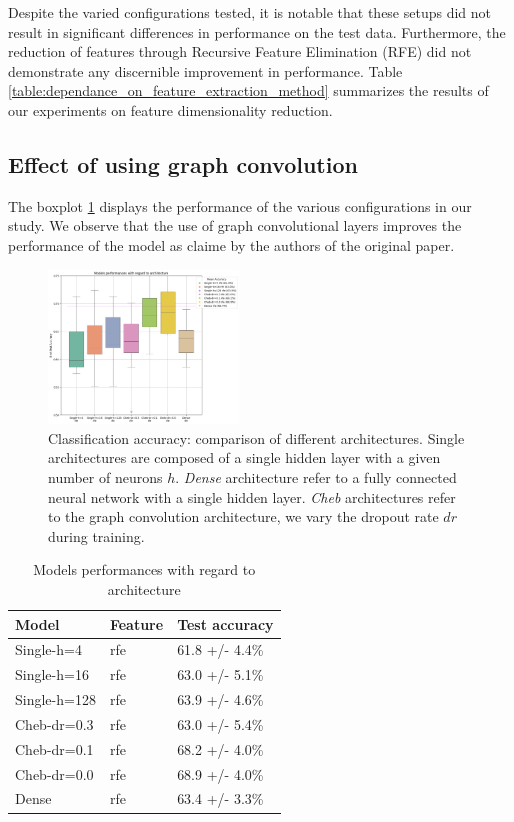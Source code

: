 Despite the varied configurations tested, it is notable that these setups did not result in significant differences in performance on the test data. Furthermore, the reduction of features through Recursive Feature Elimination (RFE) did not demonstrate any discernible improvement in performance.
Table \ref{table:dependance_on_feature_extraction_method} summarizes the results of our experiments on feature dimensionality reduction.

\subsection{Effect of using graph convolution}

The boxplot \ref{fig:results_architecture} displays the performance of the various configurations in our study. We observe that the use of graph convolutional layers improves the performance of the model as claime by the authors of the original paper.

\begin{figure}[h!]
    \centering
    \includegraphics[width=0.45\textwidth]{figures/model_performances_architecture.png}
    \caption{Classification accuracy: comparison of different architectures.
    Single architectures are composed of a single hidden layer with a given number of neurons $h$.
    \textit{Dense} architecture refer to a fully connected neural network with a single hidden layer.
    \textit{Cheb} architectures refer to the graph convolution architecture, we vary the dropout rate $dr$
    during training.}
    \Description{}
    \label{fig:results_architecture}
\end{figure}

\begin{table}[H]
	\begin{center}
		\begin{tabular}{lll}
			Model & Feature & Test accuracy \\
			\hline
			Single-h=4 & rfe & 61.8 +/- 4.4\% \\
			Single-h=16 & rfe & 63.0 +/- 5.1\% \\
			Single-h=128 & rfe & 63.9 +/- 4.6\% \\
			Cheb-dr=0.3 & rfe & 63.0 +/- 5.4\% \\
			Cheb-dr=0.1 & rfe & 68.2 +/- 4.0\% \\
			Cheb-dr=0.0 & rfe & 68.9 +/- 4.0\% \\
			Dense & rfe & 63.4 +/- 3.3\% \\
		\end{tabular}
	\end{center}
	\caption{Models performances with regard to architecture}
	\label{table:dependance_on_architecture}
\end{table}




